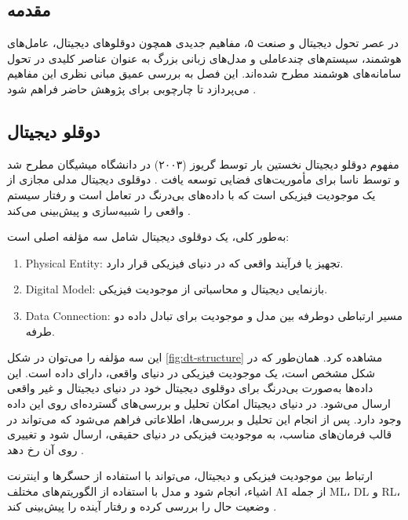 \subsection{مقدمه}

در عصر تحول دیجیتال و صنعت ۵، مفاهیم جدیدی همچون دوقلوهای دیجیتال، عامل‌های هوشمند، سیستم‌های چندعاملی و مدل‌های زبانی بزرگ به عنوان عناصر کلیدی در تحول سامانه‌های هوشمند مطرح شده‌اند. این فصل به بررسی عمیق مبانی نظری این مفاهیم می‌پردازد تا چارچوبی برای پژوهش حاضر فراهم شود \cite{barricelli2019survey,tao2019digital,grieves2017digital}.

\subsection{دوقلو دیجیتال}

مفهوم دوقلو دیجیتال نخستین بار توسط گریوز (۲۰۰۳) در دانشگاه میشیگان مطرح شد و توسط ناسا برای مأموریت‌های فضایی توسعه یافت \cite{grieves2017digital}. دوقلوی دیجیتال مدلی مجازی از یک موجودیت فیزیکی است که با داده‌های بی‌درنگ در تعامل است و رفتار سیستم واقعی را شبیه‌سازی و پیش‌بینی می‌کند \cite{barricelli2019survey,qi2021digital,jiang2023digital}. 

به‌طور کلی، یک دوقلوی دیجیتال شامل سه مؤلفه اصلی است:
\begin{enumerate}
	\item \gls{Physical Entity}: تجهیز یا فرآیند واقعی که در دنیای فیزیکی قرار دارد.
	\item \gls{Digital Model}: بازنمایی دیجیتال و محاسباتی از موجودیت فیزیکی.
	\item \gls{Data Connection}: مسیر ارتباطی دوطرفه بین مدل و موجودیت برای تبادل داده دو طرفه.
\end{enumerate}

این سه مؤلفه را می‌توان در شکل \ref{fig:dt-structure} مشاهده کرد. همان‌طور که در شکل مشخص است، یک موجودیت فیزیکی در دنیای واقعی، دارای داده است. این داده‌ها به‌صورت بی‌درنگ برای دوقلوی دیجیتال خود در دنیای دیجیتال و غیر واقعی ارسال می‌شود. در دنیای دیجیتال امکان تحلیل و بررسی‌های گسترده‌ای روی این داده وجود دارد. پس از انجام این تحلیل و بررسی‌ها، اطلاعاتی فراهم می‌شود که می‌تواند در قالب فرمان‌های مناسب، به موجودیت فیزیکی در دنیای حقیقی، ارسال شود و تغییری روی آن رخ دهد \cite{lopez2024madtwin}.


ارتباط بین موجودیت فیزیکی و دیجیتال، می‌تواند با استفاده از حسگرها و اینترنت اشیاء، انجام شود و مدل با استفاده از الگوریتم‌های مختلف \gls{AI} از جمله \gls{ML}، 
\gls{DL}
 و \gls{RL}،
  وضعیت حال را بررسی کرده و رفتار آینده را پیش‌بینی کند \cite{tao2019digital,liu2024ai}.





